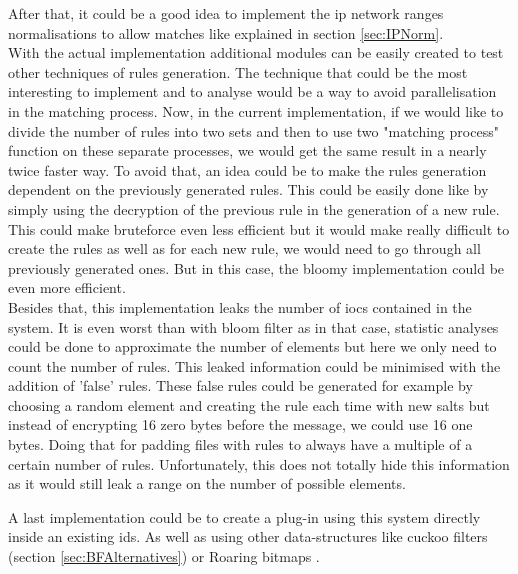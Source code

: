 \documentclass{eplmastersthesis}
\begin{document}
After that, it could be a good idea to implement the \gls{ip} network ranges normalisations to allow matches like explained in section \ref{sec:IPNorm}.\\

With the actual implementation additional modules can be easily created to test other techniques of rules generation. The technique that could be the most interesting to implement and to analyse would be a way to avoid parallelisation in the matching process.
Now, in the current implementation, if we would like to divide the number of rules into two sets and then to use two "matching process" function on these separate processes, we would get the same result in a nearly twice faster way. To avoid that, an idea could be to make the rules generation dependent on the previously generated rules. This could be easily done like by simply using the decryption of the previous rule in the generation of a new rule.
This could make bruteforce even less efficient but it would make really difficult to create the rules as well as for each new rule, we would need to go through all previously generated ones.
But in this case, the bloomy implementation could be even more efficient.\\

Besides that, this implementation leaks the number of \glspl{ioc} contained in the system. It is even worst than with bloom filter as in that case, statistic analyses could be done to approximate the number of elements but here we only need to count the number of rules. This leaked information could be minimised with the addition of 'false' rules.  These false rules could be generated for example by choosing a random element and creating the rule each time with new salts but instead of encrypting 16 zero bytes before the message, we could use 16 one bytes.
Doing that for padding files with rules to always have a multiple of a certain number of rules. Unfortunately, this does not totally hide this information as it would still leak a range on the number of possible elements.

A last implementation could be to create a plug-in using this system directly inside an existing \gls{ids}. As well as using other data-structures like cuckoo filters (section \ref{sec:BFAlternatives}) or Roaring bitmaps \cite{chambi2015better}.
\end{document}
